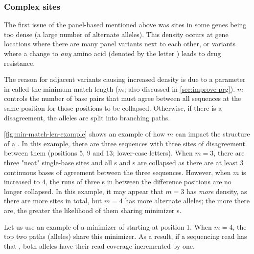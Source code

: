 \subsubsection{Complex \prg{} sites}
The first issue of the panel-based \prg{} mentioned above was sites in some genes being too dense (a large number of alternate alleles). This density occurs at gene locations where there are many panel variants next to each other, or variants where a change to \emph{any} amino acid (denoted by the letter ) leads to drug resistance. 

The reason for adjacent variants causing increased density is due to a parameter in \makeprg{} called the minimum match length ($m$; also discussed in \autoref{sec:improve-prg}). $m$ controls the number of base pairs that must agree between all sequences at the same position for those positions to be collapsed. Otherwise, if there is a disagreement, the alleles are split into branching paths. 

\autoref{fig:min-match-len-example} shows an example of how $m$ can impact the structure of a \prg{}. In this example, there are three sequences with three sites of disagreement between them (positions 5, 9 and 13; lower-case letters). When $m=3$, there are three "neat" single-base sites and all s and s are collapsed as there are at least 3 continuous bases of agreement between the three sequences. However, when $m$ is increased to 4, the runs of three s in between the difference positions are no longer collapsed. In this example, it may appear that $m=3$ has \emph{more} density, as there are more sites in total, but $m=4$ has more alternate alleles; the more there are, the greater the likelihood of them sharing minimizer \kmer{}s. 

Let us use an example of a minimizer \kmer{} of  starting at position 1. When $m=4$, the top two paths (alleles) share this minimizer. As a result, if a sequencing read has that \kmer{}, both alleles have their read coverage incremented by one. 

